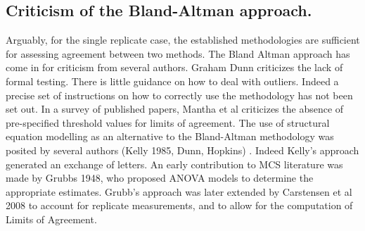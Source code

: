 \subsection*{Criticism of the Bland-Altman approach.}
Arguably, for the single replicate case, the established methodologies are sufficient for assessing agreement between two methods.
The Bland Altman approach has come in for criticism from several authors.  Graham Dunn criticizes the lack of formal testing.  There is little guidance on how to deal with outliers.
Indeed a precise set of instructions on how to correctly use the methodology has not been set out. In a survey of published papers, Mantha et al criticizes the absence of pre-specified threshold values for limits of agreement.
The use of structural equation modelling as an alternative to the Bland-Altman methodology was posited by several authors (Kelly 1985, Dunn, Hopkins) . Indeed Kelly’s approach generated an exchange of letters.                                                
An early contribution to MCS literature was made by Grubbs 1948, who proposed ANOVA models to determine the appropriate estimates. Grubb’s approach was later extended by Carstensen et al 2008 to account for replicate measurements, and to allow for the computation of Limits of Agreement.

